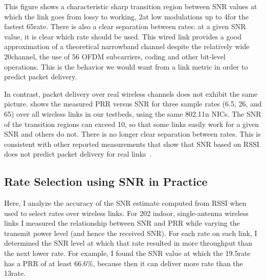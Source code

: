 This figure shows a characteristic sharp transition region between SNR values at which the link goes from lossy to working, 2\dB at low modulations up to 4\dB for the fastest 65\Mbps rate. There is also a clear separation between rates: at a given SNR value, it is clear which rate should be used. This wired link provides a good approximation of a theoretical narrowband channel despite the relatively wide 20\MHz channel, the use of 56 OFDM subcarriers, coding and other bit-level operations. This is the behavior we would want from a link metric in order to predict packet delivery.

In contrast, packet delivery over real wireless channels does not exhibit the same picture.  shows the measured PRR versus SNR for three sample rates (6.5\Mbps, 26\Mbps, and 65\Mbps) over all wireless links in our testbeds, using the same 802.11n NICs. The SNR of the transition regions can exceed 10\dB, so that some links easily work for a given SNR and others do not. There is no longer clear separation between rates. This is consistent with other reported measurements that show that SNR based on RSSI does not predict packet delivery for real links~\cite{aguayo_roofnet, Reis_sigcomm06, snr_infocom08, zhao_sensys03}.

\subsection{Rate Selection using SNR in Practice}
Here, I analyze the accuracy of the SNR estimate computed from RSSI when used to select rates over wireless links. For 202 indoor, single-antenna wireless links I measured the relationship between SNR and PRR while varying the transmit power level (and hence the received SNR). For each rate on each link, I determined the SNR level at which that rate resulted in more throughput than the next lower rate. For example, I found the SNR value at which the 19.5\Mbps rate has a PRR of at least 66.6\%, because then it can deliver more rate than the 13\Mbps rate.

